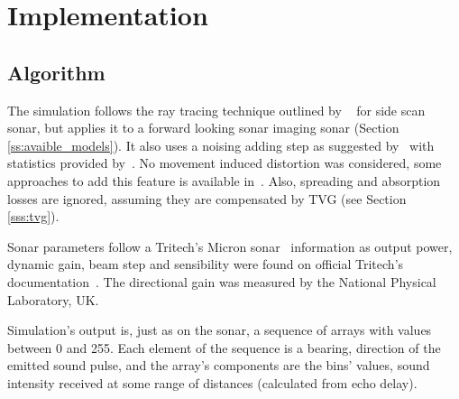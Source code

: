 
\section{Implementation}

\subsection{Algorithm}
\label{ss:algorithm}

The simulation follows the ray tracing technique outlined by
~\citet{bell1997simulation} for side scan sonar, but applies it to a forward
looking sonar imaging sonar (Section \ref{ss:avaible_models}). It also uses a
noising adding step as suggested by~\citet{coiras2009gpu} with statistics
provided by~\citet{maussang2007mean}.
No movement induced distortion was considered, some approaches to add this
feature is available in~\citet{bell1999techniques,borawski2005sonar}. Also,
spreading and absorption losses are ignored, assuming they are compensated by
TVG (see Section \ref{sss:tvg}).

Sonar parameters follow a Tritech's Micron sonar~\cite{micronsonar}
information as output power, dynamic gain, beam step and sensibility were found
on official Tritech's documentation~\cite{micronsonar,micronmodem}. The directional
gain was measured by the National Physical Laboratory, UK.

Simulation's output is, just as on the sonar, a sequence of arrays with values
between 0 and 255. Each element of the sequence is a bearing, direction of the
emitted sound pulse, and the array's components are the bins' values, sound
intensity received at some range of distances (calculated from echo delay).

